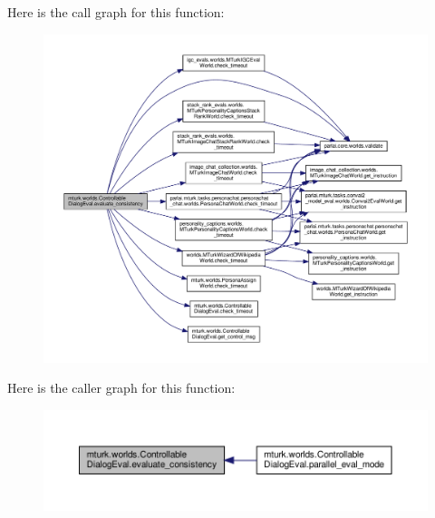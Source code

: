 Here is the call graph for this function\+:
\nopagebreak
\begin{figure}[H]
\begin{center}
\leavevmode
\includegraphics[width=350pt]{classmturk_1_1worlds_1_1ControllableDialogEval_ac91833b4ab4b602e102cef3d7a605536_cgraph}
\end{center}
\end{figure}
Here is the caller graph for this function\+:
\nopagebreak
\begin{figure}[H]
\begin{center}
\leavevmode
\includegraphics[width=350pt]{classmturk_1_1worlds_1_1ControllableDialogEval_ac91833b4ab4b602e102cef3d7a605536_icgraph}
\end{center}
\end{figure}
\mbox{\label{classmturk_1_1worlds_1_1ControllableDialogEval_a0cf75a08d4164e2b351a4ebf11e3bb53}} 
